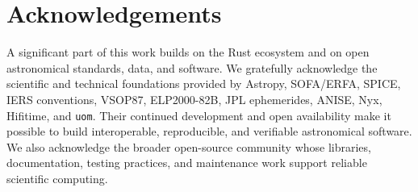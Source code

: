 \section*{Acknowledgements}

A significant part of this work builds on the Rust ecosystem and on open astronomical standards,
data, and software. We gratefully acknowledge the scientific and technical foundations provided by
Astropy, SOFA/ERFA, SPICE, IERS conventions, VSOP87, ELP2000-82B, JPL ephemerides, ANISE, Nyx,
Hifitime, and \texttt{uom}. Their continued development and open availability make it possible to
build interoperable, reproducible, and verifiable astronomical software. We also acknowledge the
broader open-source community whose libraries, documentation, testing practices, and maintenance
work support reliable scientific computing.
